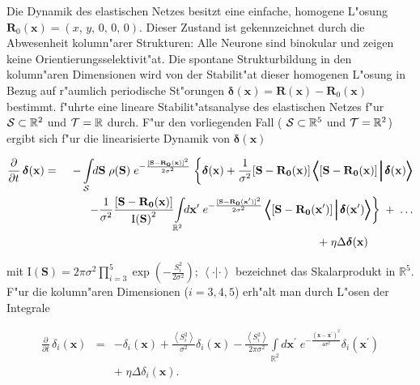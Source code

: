 Die Dynamik des elastischen Netzes besitzt eine einfache, homogene L"osung
$\mathbf{R}_0(\mathbf{x}) = (x,\, y,\, 0,\, 0,\, 0) $. Dieser Zustand ist
gekennzeichnet durch die Abwesenheit kolumn"arer Strukturen: Alle Neurone
sind binokular und zeigen keine Orientierungsselektivit"at. Die spontane
Strukturbildung in den kolumn"aren Dimensionen wird von der Stabilit"at
dieser homogenen L"osung in Bezug auf r"aumlich periodische St"orungen
$\boldsymbol{\delta}(\mathbf{x}) = \mathbf{R(x)}-\mathbf{R}_0(\mathbf{x})$
bestimmt.   f"uhrte eine lineare
Stabilit"atsanalyse des elastischen Netzes f"ur ${\cal
S}\subset\mathbb{R}^2$ und ${\cal T}=\mathbb{R}$ durch.  F"ur den
vorliegenden Fall ( ${\cal S}\subset\mathbb{R}^5$ und ${\cal
T}=\mathbb{R}^2$) ergibt sich f"ur die linearisierte Dynamik von
$\boldsymbol{\delta}(\mathbf{x})$

\begin{small}
\begin{eqnarray*}
\frac{\partial}{\partial t}\, \mathbf{\boldsymbol{\delta}(x)} &=&
-\int\limits_{\cal S}\!\!d\mathbf{S}\; \rho(\mathbf{S})\;
e^{-\frac{[\mathbf{S-R_0(x)}]^2}{2\sigma^2}}\;
\biggl\{\mathbf{\boldsymbol{\delta}(x)}\biggr.+\frac{1}{\sigma^2}
[\mathbf{S-R_0(x)}]\, \pmb{\Bigl<}\!\left[\mathbf{S-R_0(x)}\right]\pmb{\Big|\,
\delta}\mathbf{(x)}\pmb{\Bigr>}\nonumber\\
&&\qquad-\frac{1}{\sigma^2}\frac{[\mathbf{S-R_0(x)}]}{\text{I}\mathbf{(S)}^2}
\biggl.\int\limits_{\mathbb{R}^2}\!\!d\mathbf{x}^\prime\;
e^{-\frac{[\mathbf{S-R_0(\mathbf{x}^\prime)}]^2}{2\sigma^2}}\,
\pmb{\Bigl<}\!\left[\mathbf{S-R_0(\mathbf{x}^\prime)}\right]\pmb{\Big|\,
\delta}\mathbf{(\mathbf{x}^\prime)}\pmb{\Bigr>}\biggr\}\; +\; \ldots\nonumber\\ &&+\;
\eta\Delta\mathbf{\boldsymbol{\delta}(x)}\qquad\qquad
\label{lindyn}
\end{eqnarray*}
\end{small}

\noindent mit $\text{I}\mathbf{(S)} = 2\pi \sigma^2 \prod_{i=3}^5
\exp\left({-\frac{S_i^2}{2\sigma^2}}\right)$; $\pmb{\left<\cdot|\cdot\right>}$ bezeichnet
das Skalarprodukt in $\mathbb{R}^5$.  F"ur die kolumn"aren Dimensionen
($i=3,4,5$) erh"alt man durch L"osen der Integrale

\begin{eqnarray*}
\frac{\partial}{\partial t}\, \delta_i(\mathbf{x}) &=& -\delta_i(\mathbf{x})
+\frac{\left<S_i^2\right>}{\sigma^2}\delta_i(\mathbf{x})-\frac{\left<S_i^2 
\right>}{2\pi \sigma^2}\int\limits_{\mathbb{R}^2}\!\!d\mathbf{x}^\prime\;
e^{-\frac{\mathbf{(x-x^\prime)}^2}{4\sigma^2}}\delta_i(\mathbf{x}^\prime)\nonumber\\
&& +\; \eta\Delta\delta_i(\mathbf{x}).
\end{eqnarray*}

